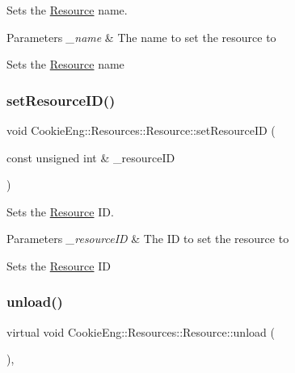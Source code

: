 Sets the \hyperlink{class_cookie_eng_1_1_resources_1_1_resource}{Resource} name. 


\begin{DoxyParams}{Parameters}
{\em \+\_\+name} & The name to set the resource to\\
\hline
\end{DoxyParams}
Sets the \hyperlink{class_cookie_eng_1_1_resources_1_1_resource}{Resource} name \mbox{\label{class_cookie_eng_1_1_resources_1_1_resource_ae7f9a2883f18b3a9d2e4e470c83bb704}} 
\subsubsection{\texorpdfstring{set\+Resource\+I\+D()}{setResourceID()}}
{\footnotesize\ttfamily void Cookie\+Eng\+::\+Resources\+::\+Resource\+::set\+Resource\+ID (\begin{DoxyParamCaption}\item[{const unsigned int \&}]{\+\_\+resource\+ID }\end{DoxyParamCaption})\hspace{0.3cm}{\ttfamily [inline]}}



Sets the \hyperlink{class_cookie_eng_1_1_resources_1_1_resource}{Resource} ID. 


\begin{DoxyParams}{Parameters}
{\em \+\_\+resource\+ID} & The ID to set the resource to\\
\hline
\end{DoxyParams}
Sets the \hyperlink{class_cookie_eng_1_1_resources_1_1_resource}{Resource} ID \mbox{\label{class_cookie_eng_1_1_resources_1_1_resource_acfe5141c546d7f3f3e08435b3a21b09c}} 
\subsubsection{\texorpdfstring{unload()}{unload()}}
{\footnotesize\ttfamily virtual void Cookie\+Eng\+::\+Resources\+::\+Resource\+::unload (\begin{DoxyParamCaption}{ }\end{DoxyParamCaption})\hspace{0.3cm}{\ttfamily [inline]}, {\ttfamily [virtual]}}



